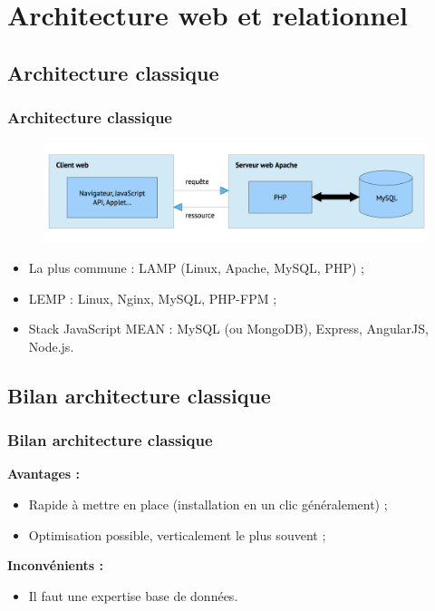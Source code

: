\section{Architecture web et relationnel}
	\subsection{Architecture classique}
	\begin{frame}
		\frametitle{Architecture classique}

		\begin{figure}[htb]
			\includegraphics[width=1\textwidth]{images/LAMP.png}
		\end{figure}

		\begin{itemize}
			\item La plus commune : LAMP (Linux, Apache, MySQL, PHP) ;
			\item LEMP : Linux, Nginx, MySQL, PHP-FPM ;
			\item Stack JavaScript MEAN : MySQL (ou MongoDB), Express, AngularJS, Node.js.
		\end{itemize}

	\end{frame}

	\subsection{Bilan architecture classique}
	\begin{frame}
		\frametitle{Bilan architecture classique}

		\textbf{Avantages :}
		\begin{itemize}
			\item Rapide à mettre en place (installation en un clic généralement) ;
			\item Optimisation possible, verticalement le plus souvent ;
		\end{itemize}

		\vspace{20px}

		\textbf{Inconvénients :}
		\begin{itemize}
			\item Il faut une expertise base de données.
		\end{itemize}

	\end{frame}

